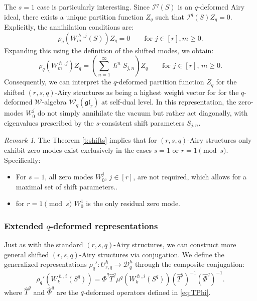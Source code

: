 \documentclass[reqno,11pt]{amsart}
\theoremstyle{plain}
\theoremstyle{definition}
\theoremstyle{remark}
\newtheorem{remark}[theorem]{Remark}
\numberwithin{equation}{section}
\newcommand{\1}{\mathds{1}}
\newcommand{\2}{\frac{1}{2}}
\begin{document}
{				The $s=1$ case is particularly interesting. Since $\mathcal{I}^q(S)$ is an $q$-deformed Airy ideal, there exists a unique partition function $Z_q$ such that $\mathcal{I}^q(S) Z_q = 0$. Explicitly, the annihilation conditions are:
				\begin{equation}
					\rho_q(W^{\hslash,j}_m(S)) Z_q = 0 \qquad \mbox{for $j\in[r], m \geq 0$.} 
				\end{equation}
				Expanding this using the definition of the shifted modes, we obtain:
				\begin{equation}
					\rho_q(W^{\hslash,j}_m) Z_q = \left(\sum_{n=1}^\infty \hslash^n S_{j,n} \right) Z_q \qquad \mbox{for $j\in[r],\, m \geq 0$.} 
				\end{equation}
				Consequently, we can interpret the $q$-deformed partition function $Z_q$ for the shifted $(r,s,q)$-Airy structures as being a highest weight vector for for the $q$-deformed $\mathcal{W}$-algebra $\mathcal{W}_q(\mathfrak{gl}_r)$ at self-dual level. In this representation, the zero-modes $W^j_0$ do not simply annihilate the vacuum but rather act diagonally, with eigenvalues prescribed by the $s$-consistent shift parameters $S_{j,n}$.
				\begin{remark}\label{r:extra}
					The Theorem \ref{t:shifts} implies that for $(r,s,q)$-Airy structures only exhibit zero-modes exist exclusively in the cases $s=1$ or $r = 1 \pmod{s}$. Specifically:
					\begin{itemize}
						\item 
						For $s=1$, all zero modes $W^j_0$, $j \in [r]$, are not required, which allows for a maximal set of shift parameters..
						\item for $r=1 \pmod{s}$  $W^1_0$ is the only residual zero mode.
					\end{itemize}
				\end{remark}
				\subsubsection{Extended $q$-deformed representations}
				Just as with the standard $(r,s,q)$-Airy structures, we can construct more general shifted $(r,s,q)$-Airy structures via conjugation. We define the generalized representations
				$\rho_q': U^\hslash_{r,q} \to \mathcal{D}_{q}^\hslash$  through the composite conjugation:
				\begin{equation}\label{eq:rep2p}
					\rho_q'( W^{\hslash,i}_k(S^q)) = \hat{\Phi}^q\hat{T}^q \mu^q(W^{\hslash,i}_k(S^q)) (\hat{T}^q)^{-1} (\hat{\Phi}^q)^{-1}.
				\end{equation}
				where $\hat{T}^q$ and $\hat{\Phi}^q$ are the $q$-deformed operators defined in \eqref{eq:TPhi}.
				
}
\end{document}

